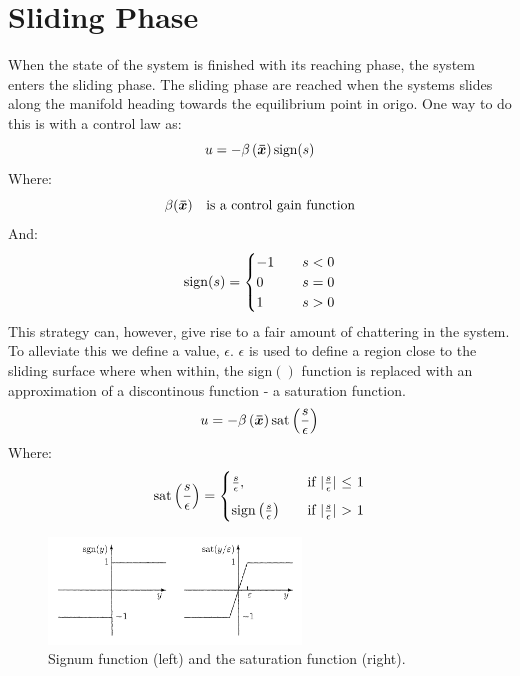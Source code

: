 \chapter{Sliding Phase}
When the state of the system is finished with its reaching phase, the system enters the sliding phase. The sliding phase are reached when the systems slides along the manifold heading towards the equilibrium point in origo. One way to do this is with a control law as:
\begin{equation}
  u = -\beta \left( \bm{\bar{x}} \right)\mathrm{sign}(s)
\end{equation}
Where:
\begin{equation}
  \beta (\bm{\bar{x}}) \quad\text{is a control gain function}
\nonumber
\end{equation}
And:
\begin{equation}
  \mathrm{sign}(s) =
  \begin{cases}
    -1 & \quad s < 0 \\
     0 & \quad s = 0 \\
     1 & \quad s > 0
  \end{cases}
\nonumber
\end{equation}
This strategy can, however, give rise to a fair amount of chattering in the system. To alleviate this we define a value, $\epsilon$. $\epsilon$ is used to define a region close to the sliding surface where when within, the sign$()$ function is replaced with an approximation of a discontinous function - a saturation function.
\begin{equation}
  u = -\beta\left( \bm{\bar{x}} \right) \mathrm{sat}\left( \frac{s}{\epsilon} \right)
\end{equation}
Where:
\begin{equation}
  \mathrm{sat}\left( \frac{s}{\epsilon} \right) =
  \begin{cases}
    \frac{s}{\epsilon}, &\quad \text{if $\vert\frac{s}{\epsilon}\vert$ $\leq$ 1} \\[2mm]
    \mathrm{sign}\left( \frac{s}{\epsilon} \right) &\quad \text{if $\vert \frac{s}{\epsilon}\vert$ $>$ 1}
  \end{cases}
\end{equation}

\begin{figure}[H]
  \centering
  \includegraphics[width=0.6\textwidth]{saturation}
  \caption{Signum function (left) and the saturation function (right).}
  \label{fig:sign_sat}
\end{figure}


